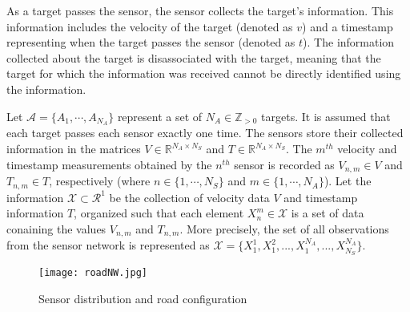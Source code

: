 \documentclass[letterpaper, 10 pt, conference]{ieeeconf}
\begin{document}
As a target passes the sensor, the sensor collects the target's information. This information includes the velocity of the target (denoted as $v$) and a timestamp representing when the target passes the sensor (denoted as $t$). The information collected about the target is disassociated with the target, meaning that the target for which the information was received cannot be directly identified using the information. 

Let $\mathcal{A}=\{A_1,\cdots,A_{N_A}\}$ represent a set of $N_A\in \mathbb{Z}_{>0}$ targets. It is assumed that each target passes each sensor exactly one time. The sensors store their collected information in the matrices $V\in \mathbb{R}^{N_{A}\times N_{S}}$ and $T\in \mathbb{R}^{N_{A}\times N_{S}}$. The $m^{th}$ velocity and timestamp measurements obtained by the $n^{th}$ sensor is recorded as $V_{n,m}\in V$ and $T_{n,m}\in T$, respectively (where $n\in \{1,\cdots,N_S\}$ and $m\in \{1,\cdots,N_A\}$). Let the information $\mathcal{X}\subset \mathcal{R}^1$ be the collection of velocity data $V$ and timestamp information $T$, organized such that each element $X_{n}^m\in \mathcal{X}$ is a set of data conaining the values $V_{n,m}$ and $T_{n,m}$. More precisely, the set of all observations from the sensor network is represented as $\mathcal{X} = \{X_1^1, X_1^2,...,X_1^{N_A},...,X_{N_S}^{N_A}\}$.



\begin{figure}[ht!]
\centering
\captionsetup{justification=centering}
\texttt{[image: roadNW.jpg]}
\caption{Sensor distribution and road configuration}
\label{fig:roadNW}
\end{figure}
\end{document}
